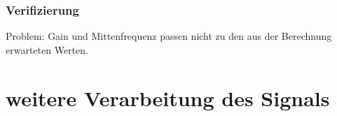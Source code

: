 \documentclass[aspectratio=169]{beamer}
\begin{document}
\begin{frame}
    \frametitle{Verifizierung}
    \begin{alertblock}{Problem:}
        Gain und Mittenfrequenz passen nicht zu den aus der Berechnung erwarteten Werten.
    \end{alertblock}
    \vfill
\end{frame}

\section{weitere Verarbeitung des Signals}
\end{document}
